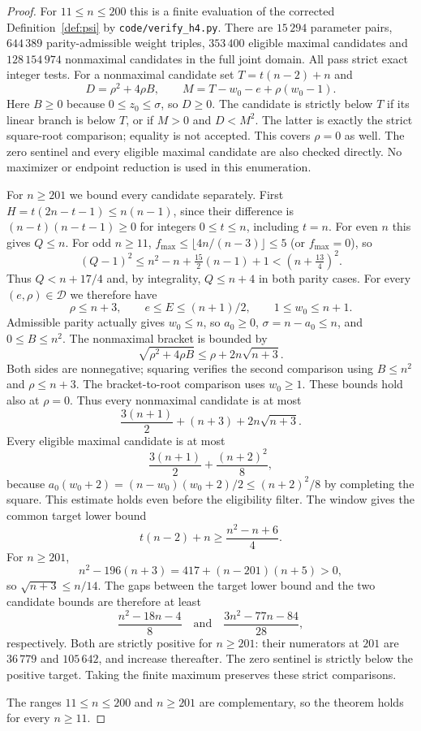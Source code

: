\documentclass[11pt,a4paper]{amsart}
\theoremstyle{plain}
\theoremstyle{definition}
\begin{document}
\begin{proof}
For $11\le n\le200$ this is a finite evaluation of the corrected
Definition~\ref{def:psi} by \texttt{code/verify\_h4.py}. There are
$15\,294$ parameter pairs, $644\,389$ parity-admissible weight triples,
$353\,400$ eligible maximal candidates and $128\,154\,974$ nonmaximal
candidates in the full joint domain. All pass strict exact integer tests.
For a nonmaximal candidate set $T=t(n-2)+n$ and
\[
 D=\rho^2+4\rho B,\qquad M=T-w_0-e+\rho(w_0-1).
\]
Here $B\ge0$ because $0\le z_0\le\sigma$, so $D\ge0$. The candidate is
strictly below $T$ if its linear branch is below $T$, or if $M>0$ and
$D<M^2$. The latter is exactly the strict square-root comparison; equality
is not accepted. This covers $\rho=0$ as well. The zero sentinel and every
eligible maximal candidate are also checked directly. No maximizer or
endpoint reduction is used in this enumeration.

For $n\ge201$ we bound every candidate separately. First
$H=t(2n-t-1)\le n(n-1)$, since their difference is
$(n-t)(n-t-1)\ge0$ for integers $0\le t\le n$, including $t=n$.
For even $n$ this gives $Q\le n$. For odd $n\ge11$,
$f_{\max}\le\lfloor4n/(n-3)\rfloor\le5$ (or $f_{\max}=0$), so
\[
 (Q-1)^2\le n^2-n+\tfrac{15}{2}(n-1)+1
 <(n+\tfrac{13}{4})^2.
\]
Thus $Q<n+17/4$ and, by integrality, $Q\le n+4$ in both parity cases.
For every $(e,\rho)\in\mathcal D$ we therefore have
\[
 \rho\le n+3,\qquad e\le E\le(n+1)/2,\qquad 1\le w_0\le n+1.
\]
Admissible parity actually gives $w_0\le n$, so $a_0\ge0$,
$\sigma=n-a_0\le n$, and $0\le B\le n^2$.
The nonmaximal bracket is bounded by
\[
 \sqrt{\rho^2+4\rho B}\le\rho+2n\sqrt{n+3}.
\]
Both sides are nonnegative; squaring verifies the second comparison using
$B\le n^2$ and $\rho\le n+3$. The bracket-to-root comparison uses $w_0\ge1$. These bounds
hold also at $\rho=0$. Thus every nonmaximal candidate is at most
\[
 \frac{3(n+1)}2+(n+3)+2n\sqrt{n+3}.
\]
Every eligible maximal candidate is at most
\[
 \frac{3(n+1)}2+\frac{(n+2)^2}{8},
\]
because $a_0(w_0+2)=(n-w_0)(w_0+2)/2\le(n+2)^2/8$ by completing
the square. This estimate holds even before the eligibility filter.
The window gives the common target lower bound
\[
 t(n-2)+n\ge\frac{n^2-n+6}{4}.
\]
For $n\ge201$,
\[
 n^2-196(n+3)=417+(n-201)(n+5)>0,
\]
so $\sqrt{n+3}\le n/14$. The gaps between the target lower bound and
the two candidate bounds are therefore at least
\[
 \frac{n^2-18n-4}{8}\quad\text{and}\quad
 \frac{3n^2-77n-84}{28},
\]
respectively. Both are strictly positive for $n\ge201$: their numerators
at $201$ are $36\,779$ and $105\,642$, and increase thereafter.
The zero sentinel is strictly below the positive target. Taking the finite
maximum preserves these strict comparisons.

The ranges $11\le n\le200$ and $n\ge201$ are complementary, so the theorem
holds for every $n\ge11$.
\end{proof}
\end{document}
